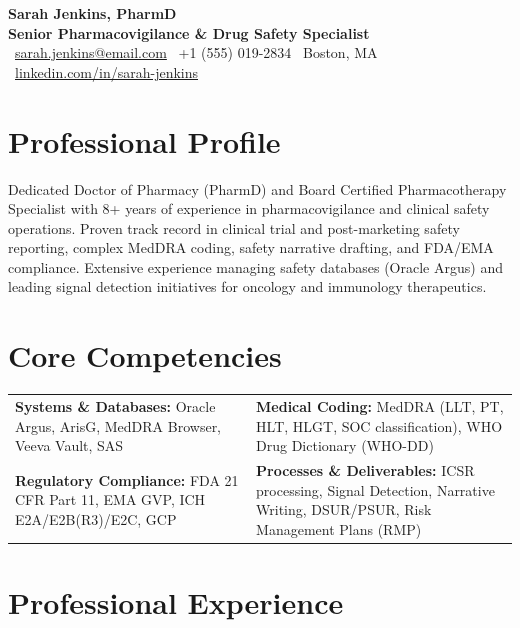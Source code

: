 \documentclass[10pt,oneside]{article}
\begin{document}
\begin{center}
    {\fontsize{20}{24}\selectfont\bfseries\color{primaryColor} Sarah Jenkins, PharmD} \\[0.2em]
    {\fontsize{11}{13}\selectfont\bfseries\color{secondaryColor} Senior Pharmacovigilance \& Drug Safety Specialist} \\[0.4em]
    {\color{secondaryColor}\small
    \faEnvelope\ \href{mailto:sarah.jenkins@email.com}{sarah.jenkins@email.com} \quad \textbullet \quad
    \faPhone\ +1 (555) 019-2834 \quad \textbullet \quad
    \faMapMarker\ Boston, MA \quad \textbullet \quad
    \faLinkedin\ \href{https://linkedin.com/in/fictional-sarah-jenkins}{linkedin.com/in/sarah-jenkins}
    }
\end{center}

\vspace{-6pt}

\section*{Professional Profile}
Dedicated Doctor of Pharmacy (PharmD) and Board Certified Pharmacotherapy Specialist with 8+ years of experience in pharmacovigilance and clinical safety operations. Proven track record in clinical trial and post-marketing safety reporting, complex MedDRA coding, safety narrative drafting, and FDA/EMA compliance. Extensive experience managing safety databases (Oracle Argus) and leading signal detection initiatives for oncology and immunology therapeutics.

\section*{Core Competencies}
\begin{tabularx}{\textwidth}{@{} X X @{}}
    \textbf{Systems \& Databases:} Oracle Argus, ArisG, MedDRA Browser, Veeva Vault, SAS &
    \textbf{Medical Coding:} MedDRA (LLT, PT, HLT, HLGT, SOC classification), WHO Drug Dictionary (WHO-DD) \\[4pt]
    \textbf{Regulatory Compliance:} FDA 21 CFR Part 11, EMA GVP, ICH E2A/E2B(R3)/E2C, GCP &
    \textbf{Processes \& Deliverables:} ICSR processing, Signal Detection, Narrative Writing, DSUR/PSUR, Risk Management Plans (RMP)
\end{tabularx}

\section*{Professional Experience}
\end{document}
